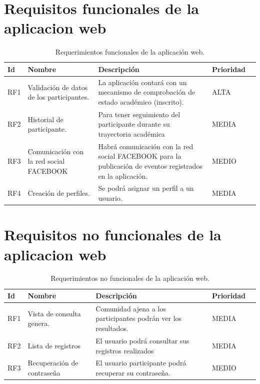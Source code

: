	\section{Requisitos funcionales de la aplicacion web}
	
	\begin{table}[htbp]
		\begin{center}
			\begin{tabular}{|l|p{45mm}|p{45mm}|p{45mm}|l}
				\hline
				Id & Nombre & Descripción & Prioridad \\
				\hline 
				RF1 & Validación de datos de los participantes. & La aplicación contará con un mecanismo de comprobación de estado académico (inscrito). & ALTA \\ \hline
				RF2 & Historial de participante. & Para tener seguimiento del participante durante su trayectoria académica & MEDIA  \\ \hline
				RF3 & Comunicación con la red social FACEBOOK &Habrá comunicación con la red social FACEBOOK para la publicación de eventos registrados en la aplicación.  & MEDIO \\ \hline
				RF4 & Creación de perfiles. & Se podrá asignar un perfil a un usuario.& MEDIA \\ \hline
			\end{tabular}
			\pagebreak
			\caption{Requerimientos funcionales de la aplicación web.}
			\label{tabla:sencilla}
		\end{center}
	\end{table}
	
	
	\section{Requisitos no funcionales de la aplicacion web}
	
	\begin{table}[htbp]
		\begin{center}
			\begin{tabular}{|l|p{45mm}|p{45mm}|p{45mm}|l}
				\hline
				Id & Nombre & Descripción & Prioridad \\
				\hline 
				RF1 & Vista de consulta genera. & Comunidad ajena a los participantes podrán ver los resultados. & MEDIA \\ \hline
				RF2 & Lista de registros &El usuario podrá consultar sus registros realizados & MEDIA   \\ \hline
				RF3 & Recuperación de contraseña &El usuario participante podrá recuperar su contraseña. & MEDIO \\ \hline
			\end{tabular}
			\caption{Requerimientos no funcionales de la aplicación web.}
			\label{tabla:sencilla}
		\end{center}
	\end{table}
	
